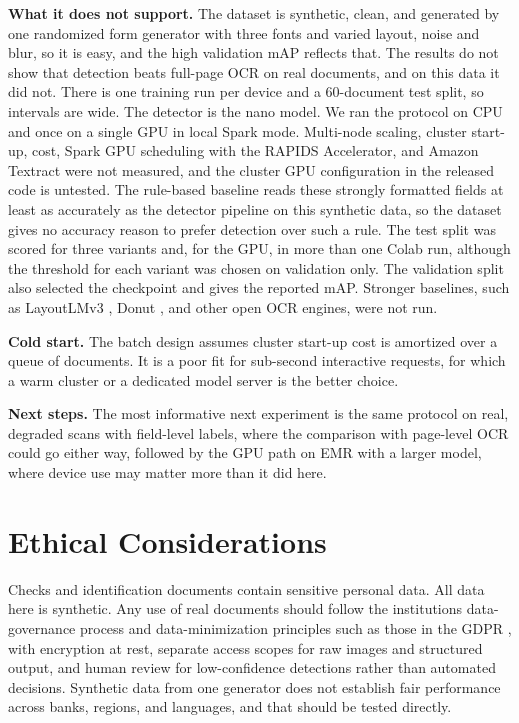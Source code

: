 \textbf{What it does not support.} The dataset is synthetic, clean, and generated by one randomized form generator with three fonts and varied layout, noise and blur, so it is easy, and the high validation mAP reflects that. The results do not show that detection beats full-page OCR on real documents, and on this data it did not. There is one training run per device and a 60-document test split, so intervals are wide. The detector is the nano model. We ran the protocol on CPU and once on a single GPU in local Spark mode. Multi-node scaling, cluster start-up, cost, Spark GPU scheduling with the RAPIDS Accelerator, and Amazon Textract were not measured, and the cluster GPU configuration in the released code is untested. The rule-based baseline reads these strongly formatted fields at least as accurately as the detector pipeline on this synthetic data, so the dataset gives no accuracy reason to prefer detection over such a rule. The test split was scored for three variants and, for the GPU, in more than one Colab run, although the threshold for each variant was chosen on validation only. The validation split also selected the checkpoint and gives the reported mAP. Stronger baselines, such as LayoutLMv3 \cite{huang2022layoutlmv3}, Donut \cite{kim2022donut}, and other open OCR engines, were not run.

\textbf{Cold start.} The batch design assumes cluster start-up cost is amortized over a queue of documents. It is a poor fit for sub-second interactive requests, for which a warm cluster or a dedicated model server is the better choice.

\textbf{Next steps.} The most informative next experiment is the same protocol on real, degraded scans with field-level labels, where the comparison with page-level OCR could go either way, followed by the GPU path on EMR with a larger model, where device use may matter more than it did here.

\section{Ethical Considerations}
Checks and identification documents contain sensitive personal data. All data here is synthetic. Any use of real documents should follow the institution\textquotesingle{}s data-governance process and data-minimization principles such as those in the GDPR \cite{gdpr}, with encryption at rest, separate access scopes for raw images and structured output, and human review for low-confidence detections rather than automated decisions. Synthetic data from one generator does not establish fair performance across banks, regions, and languages, and that should be tested directly.

